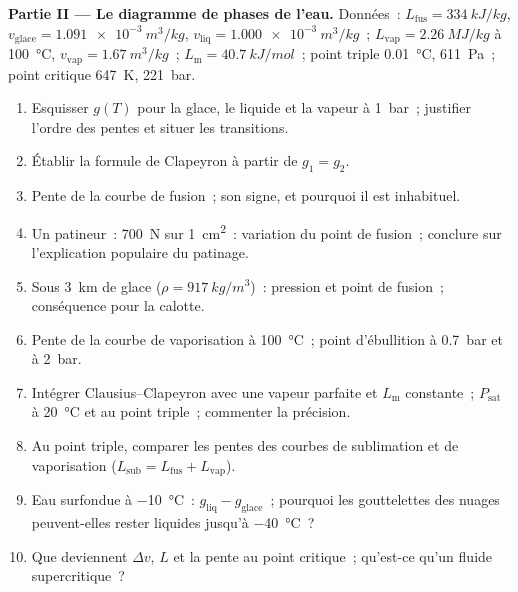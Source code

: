 \begin{problem}
\textbf{Partie II --- Le diagramme de phases de l'eau.}
Données~: $L_{\text{fus}} = \qty{334}{kJ/kg}$, $v_{\text{glace}} = \qty{1.091e-3}{m^3/kg}$,
$v_{\text{liq}} = \qty{1.000e-3}{m^3/kg}$~; $L_{\text{vap}} = \qty{2.26}{MJ/kg}$ à
\qty{100}{\celsius}, $v_{\text{vap}} = \qty{1.67}{m^3/kg}$~; $L_{\text{m}} = \qty{40.7}{kJ/mol}$~;
point triple \qty{0.01}{\celsius}, \qty{611}{Pa}~; point critique \qty{647}{K},
\qty{221}{bar}.
\begin{enumerate}[resume]
  \item Esquisser $g(T)$ pour la glace, le liquide et la vapeur à \qty{1}{bar}~; justifier
        l'ordre des pentes et situer les transitions.
  \item Établir la formule de Clapeyron à partir de $g_1 = g_2$.
  \item Pente de la courbe de fusion~; son signe, et pourquoi il est inhabituel.
  \item Un patineur~: \qty{700}{N} sur \qty{1}{cm^2}~: variation du point de
        fusion~; conclure sur l'explication populaire du patinage.
  \item Sous \qty{3}{km} de glace ($\rho = \qty{917}{kg/m^3}$)~: pression et
        point de fusion~; conséquence pour la calotte.
  \item Pente de la courbe de vaporisation à \qty{100}{\celsius}~; point
        d'ébullition à \qty{0.7}{bar} et à \qty{2}{bar}.
  \item Intégrer Clausius--Clapeyron avec une vapeur parfaite et
        $L_{\text{m}}$ constante~; $P_{\text{sat}}$ à \qty{20}{\celsius} et au
        point triple~; commenter la précision.
  \item Au point triple, comparer les pentes des courbes de sublimation et de
        vaporisation ($L_{\text{sub}} = L_{\text{fus}} + L_{\text{vap}}$).
  \item Eau surfondue à \qty{-10}{\celsius}~: $g_{\text{liq}} - g_{\text{glace}}$~;
        pourquoi les gouttelettes des nuages peuvent-elles rester liquides jusqu'à \qty{-40}{\celsius}~?
  \item Que deviennent $\Delta v$, $L$ et la pente au point
        critique~; qu'est-ce qu'un fluide supercritique~?
\end{enumerate}


\end{problem}
